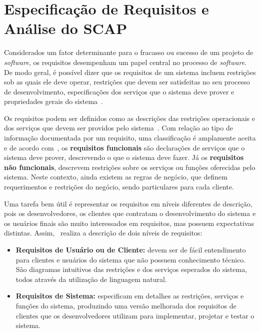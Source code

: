 \chapter{Especificação de Requisitos e Análise do SCAP}
\label{sec-requisitos}

Considerados um fator determinante para o fracasso ou sucesso de um projeto de \textit{software}, os requisitos desempenham um papel central no processo de \textit{software}. De modo geral, é possível dizer que os requisitos de um sistema incluem restrições sob as quais ele deve operar, restrições que devem ser satisfeitas no seu processo de desenvolvimento, especificações dos serviços que o sistema deve prover e propriedades gerais do sistema~\cite{falbo:er17}.

Os requisitos podem ser definidos como as descrições das restrições operacionais e dos serviços que devem ser providos pelo sistema~\cite{sommerville:es07}. Com relação ao tipo de informação documentada por um requisito, uma classificação é amplamente aceita e de acordo com~, os \textbf{requisitos funcionais} são declarações de serviços que o sistema deve prover, descrevendo o que o sistema deve fazer. Já os \textbf{requisitos não funcionais}, descrevem restrições sobre os serviços ou funções oferecidas pelo sistema. Neste contexto, ainda existem as regras de negócio, que definem requerimentos e restrições do negócio, sendo particulares para cada cliente.

Uma tarefa bem útil é representar os requisitos em níveis diferentes de descrição, pois os desenvolvedores, os clientes que contratam o desenvolvimento do sistema e os usuários finais são muito interessados em requisitos, mas possuem expectativas distintas. Assim,~ realiza a descrição de dois níveis de requisitos:

\begin{itemize}

	\item \textbf{Requisitos de Usuário ou de Cliente:} devem ser de fácil entendimento para clientes e usuários do sistema que não possuem conhecimento técnico. São diagramas intuitivos das restrições e dos serviços esperados do sistema, todos através da utilização de linguagem natural.
	
	\item \textbf{Requisitos de Sistema:} especificam em detalhes as restrições, serviços e funções do sistema, produzindo uma versão melhorada dos requisitos de clientes que os desenvolvedores utilizam para implementar, projetar e testar o sistema. 

\end{itemize}


